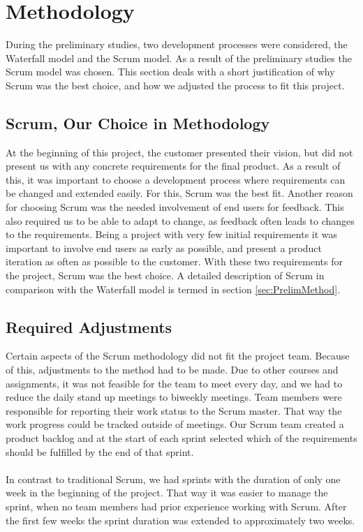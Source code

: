 \section{Methodology}
\label{sec:PlanningMethod}
During the preliminary studies, two development processes were considered, the Waterfall model and the Scrum model. As a result of the preliminary studies the Scrum model was chosen. This section deals with a short justification of why Scrum was the best choice, and how we adjusted the process to fit this project.

\subsection*{Scrum, Our Choice in Methodology}
\label{subsec:PlanningMethodChoice}
At the beginning of this project, the customer presented their vision, but did not present us with any concrete requirements for the final product. As a result of this, it was important to choose a development process where requirements can be changed and extended easily. For this, Scrum was the best fit. Another reason for choosing Scrum was the needed involvement of end users for feedback. This also required us to be able to adapt to change, as feedback often leads to changes to the requirements. Being a project with very few initial requirements it was important to involve end users as early as possible, and present a  product iteration as often as possible to the customer. With these two requirements for the project, Scrum was the best choice. A detailed description of Scrum in comparison with the Waterfall model is termed in section \ref{sec:PrelimMethod}.

\subsection*{Required Adjustments}
\label{subsec:PlanningMethodAdjust}
Certain aspects of the Scrum methodology did not fit the project team. Because of this, adjustments to the method had to be made. Due to other courses and assignments, it was not feasible for the team to meet every day, and we had to reduce the daily stand up meetings to biweekly meetings. Team members were responsible for reporting their work status to the Scrum master. That way the work progress could be tracked outside of meetings. Our Scrum team created a product backlog and at the start of each sprint selected which of the requirements should be fulfilled by the end of that sprint.

\paragraph{} In contrast to traditional Scrum, we had sprints with the duration of only one week in the beginning of the project. That way it was easier to manage the sprint, when no team members had prior experience working with Scrum. After the first few weeks the sprint duration was extended to approximately two weeks.

